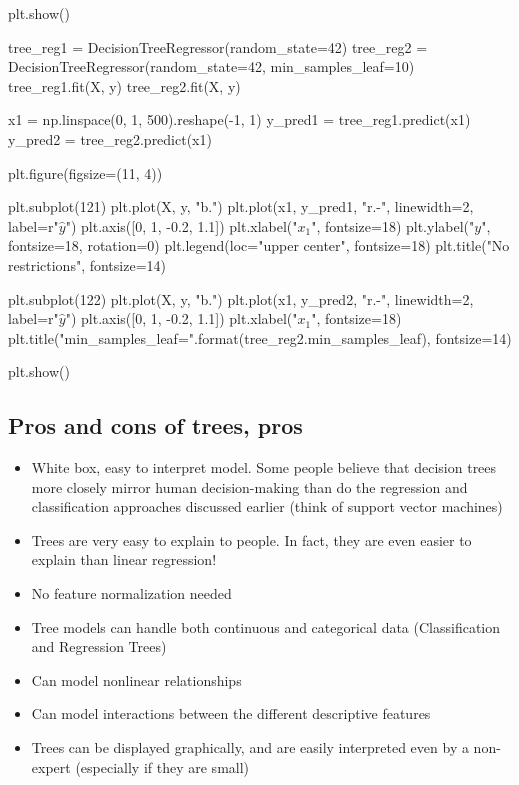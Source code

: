 \documentclass[%
oneside,                 %
final,                   %
10pt]{article}
\begin{document}
plt.show()
\epycod

\bpycod
tree_reg1 = DecisionTreeRegressor(random_state=42)
tree_reg2 = DecisionTreeRegressor(random_state=42, min_samples_leaf=10)
tree_reg1.fit(X, y)
tree_reg2.fit(X, y)

x1 = np.linspace(0, 1, 500).reshape(-1, 1)
y_pred1 = tree_reg1.predict(x1)
y_pred2 = tree_reg2.predict(x1)

plt.figure(figsize=(11, 4))

plt.subplot(121)
plt.plot(X, y, "b.")
plt.plot(x1, y_pred1, "r.-", linewidth=2, label=r"$\hat{y}$")
plt.axis([0, 1, -0.2, 1.1])
plt.xlabel("$x_1$", fontsize=18)
plt.ylabel("$y$", fontsize=18, rotation=0)
plt.legend(loc="upper center", fontsize=18)
plt.title("No restrictions", fontsize=14)

plt.subplot(122)
plt.plot(X, y, "b.")
plt.plot(x1, y_pred2, "r.-", linewidth=2, label=r"$\hat{y}$")
plt.axis([0, 1, -0.2, 1.1])
plt.xlabel("$x_1$", fontsize=18)
plt.title("min_samples_leaf={}".format(tree_reg2.min_samples_leaf), fontsize=14)

plt.show()
\epycod



\subsection{Pros and cons of trees, pros}

\begin{itemize}
\item White box, easy to interpret model. Some people believe that decision trees more closely mirror human decision-making than do the regression and classification approaches discussed earlier (think of support vector machines)

\item Trees are very easy to explain to people. In fact, they are even easier to explain than linear regression!

\item No feature normalization needed

\item Tree models can handle both continuous and categorical data (Classification and Regression Trees)

\item Can model nonlinear relationships

\item Can model interactions between the different descriptive features

\item Trees can be displayed graphically, and are easily interpreted even by a non-expert (especially if they are small)
\end{itemize}
\end{document}
